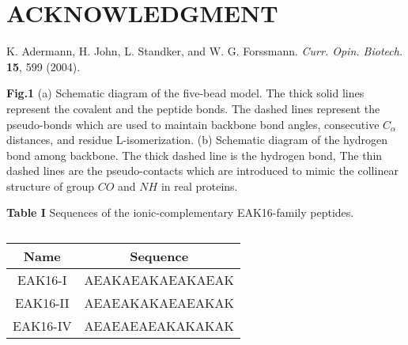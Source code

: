 \documentclass[preprint,preprintnumbers,amsmath,amssymb,showpacs,pre]{revtex4-1}
\begin{document}
\section*{ACKNOWLEDGMENT}

\begin{thebibliography}{10}

K. Adermann, H. John, L. Standker, and W. G. Forssmann.
{\it Curr. Opin. Biotech.} {\bf 15}, 599 (2004).

\end{thebibliography}

\newpage
\vspace{0.5cm}
\parindent 0pt {\large {\bf Fig.1}}
(a) Schematic diagram of the five-bead model. The thick solid lines
represent the covalent and the peptide bonds. The dashed lines
represent the pseudo-bonds which are used to maintain backbone bond
angles, consecutive $C_{\alpha}$ distances, and residue
L-isomerization. (b) Schematic diagram of the hydrogen bond among
backbone. The thick dashed line is the hydrogen bond, The thin
dashed lines are the pseudo-contacts which are introduced to mimic
the collinear structure of group $CO$ and $NH$ in real proteins.

\vspace{0.5cm}
\parindent 0pt {\large {\bf Table I}}
Sequences of the ionic-complementary EAK16-family peptides.

\newpage

\begin{table}
  \centering
  \caption{}
  \begin{tabular}[t]{c|c}
    \hline
     Name & Sequence \\
    \hline
     EAK16-I  & AEAKAEAKAEAKAEAK \\
     EAK16-II & AEAEAKAKAEAEAKAK \\
     EAK16-IV & AEAEAEAEAKAKAKAK \\
    \hline
  \end{tabular}
\end{table}

\end{document}

